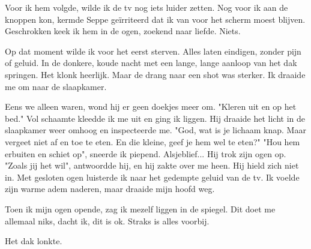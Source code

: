 \documentclass[12pt, justified, a4paper, symmetric]{tufte-book}
\begin{document}
Voor ik hem volgde, wilde ik de tv nog iets luider zetten. Nog voor ik aan de knoppen kon, kermde Seppe ge\"irriteerd dat ik van voor het scherm moest blijven. Geschrokken keek ik hem in de ogen, zoekend naar liefde. Niets.

Op dat moment wilde ik voor het eerst sterven. Alles laten eindigen, zonder pijn of geluid. In de donkere, koude nacht met een lange, lange aanloop van het dak springen. Het klonk heerlijk. Maar de drang naar een shot was sterker. Ik draaide me om naar de slaapkamer.

Eens we alleen waren, wond hij er geen doekjes meer om. "Kleren uit en op het bed." Vol schaamte kleedde ik me uit en ging ik liggen. Hij draaide het licht in de slaapkamer weer omhoog en inspecteerde me. "God, wat is je lichaam knap. Maar vergeet niet af en toe te eten. En die kleine, geef je hem wel te eten?" "Hou hem erbuiten en schiet op", sneerde ik piepend. Alsjeblief... Hij trok zijn ogen op. "Zoals jij het wil", antwoordde hij, en hij zakte over me heen. Hij hield zich niet in. Met gesloten ogen luisterde ik naar het gedempte geluid van de tv. Ik voelde zijn warme adem naderen, maar draaide mijn hoofd weg.

Toen ik mijn ogen opende, zag ik mezelf liggen in de spiegel. Dit doet me allemaal niks, dacht ik, dit is ok. Straks is alles voorbij.

Het dak lonkte.
\end{document}
